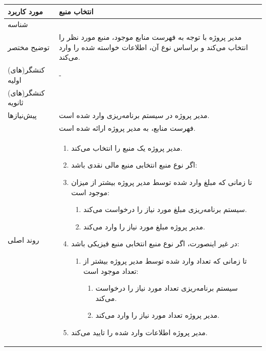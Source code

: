 \begin{table}[H]
	\centering
	\begin{tabular}{|p{3cm}|p{10cm}|}
		\hline
		
		
		مورد کاربرد	& انتخاب منبع  \\
		\hline
		
		شناسه & 
		\stepcounter{usecase_ID}
		
		\arabic{usecase_ID} \\
		
		\hline
		
		توضیح مختصر & مدیر پروژه با توجه به فهرست منابع موجود، منبع مورد نظر را انتخاب می‌کند و براساس نوع آن، اطلاعات خواسته شده را وارد می‌کند. \\
		\hline
		
		کنشگر(های) اولیه& - \\
		\hline
		
		کنشگر(های) ثانویه&  \\
		\hline
		
		پیش‌نیازها &
		مدیر پروژه در سیستم برنامه‌ریزی وارد شده است.\\
		& فهرست منابع، به مدیر پروژه ارائه شده است. \\
		\hline
		
		
		روند اصلی &
		\begin{enumerate}[topsep=0cm,leftmargin=0.5cm]
			\item  مدیر پروژه یک منبع را انتخاب می‌کند.
			\item اگر نوع منبع انتخابی منبع مالی نقدی باشد:
			\item تا زمانی که مبلغ وارد شده توسط مدیر پروژه بیشتر از میزان موجود است:
			\begin{enumerate}[topsep=0cm,leftmargin=0.5cm]
				\item سیستم برنامه‌ریزی مبلغ مورد نیاز را درخواست می‌کند.
				\item مدیر پروژه مبلغ مورد نیاز را وارد می‌کند.
			\end{enumerate}
			\item در غیر اینصورت، اگر نوع منبع انتخابی منبع فیزیکی باشد:
			\begin{enumerate}[topsep=0cm,leftmargin=0.5cm]
				\item تا زمانی که تعداد وارد شده توسط مدیر پروژه بیشتر از تعداد موجود است:
				\begin{enumerate}[topsep=0cm,leftmargin=0.5cm]
					\item سیستم برنامه‌ریزی تعداد مورد نیاز را درخواست می‌کند.
					\item مدیر پروژه تعداد مورد نیاز را وارد می‌کند.
				\end{enumerate}
			\end{enumerate}
			\item مدیر پروژه اطلاعات وارد شده را تایید می‌کند.
		\end{enumerate}\\
		\hline
		

\end{tabular}
\end{table}
